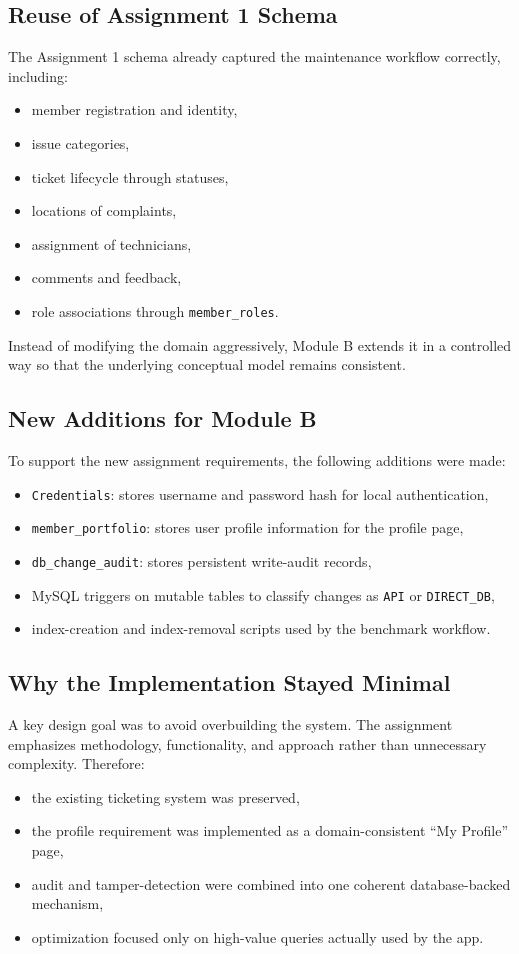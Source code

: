 \documentclass[12pt,a4paper]{article}
\begin{document}
\subsection{Reuse of Assignment 1 Schema}
The Assignment 1 schema already captured the maintenance workflow correctly, including:
\begin{itemize}[leftmargin=1.5em]
    \item member registration and identity,
    \item issue categories,
    \item ticket lifecycle through statuses,
    \item locations of complaints,
    \item assignment of technicians,
    \item comments and feedback,
    \item role associations through \texttt{member\_roles}.
\end{itemize}

Instead of modifying the domain aggressively, Module B extends it in a controlled way so that the underlying conceptual model remains consistent.

\subsection{New Additions for Module B}
To support the new assignment requirements, the following additions were made:
\begin{itemize}[leftmargin=1.5em]
    \item \texttt{Credentials}: stores username and password hash for local authentication,
    \item \texttt{member\_portfolio}: stores user profile information for the profile page,
    \item \texttt{db\_change\_audit}: stores persistent write-audit records,
    \item MySQL triggers on mutable tables to classify changes as \texttt{API} or \texttt{DIRECT\_DB},
    \item index-creation and index-removal scripts used by the benchmark workflow.
\end{itemize}

\subsection{Why the Implementation Stayed Minimal}
A key design goal was to avoid overbuilding the system. The assignment emphasizes methodology, functionality, and approach rather than unnecessary complexity. Therefore:
\begin{itemize}[leftmargin=1.5em]
    \item the existing ticketing system was preserved,
    \item the profile requirement was implemented as a domain-consistent ``My Profile'' page,
    \item audit and tamper-detection were combined into one coherent database-backed mechanism,
    \item optimization focused only on high-value queries actually used by the app.
\end{itemize}
\end{document}
